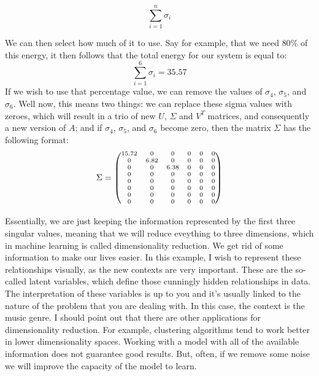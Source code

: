 \documentclass[600paper, 11pt,twoside,openany]{kdp}
\begin{document}
\[\sum_{i=1}^n \sigma_i\]
\par 
\vspace{-3pt}
\indent We can then select how much of it to use. Say for example, that we need $80\%$ of this energy, it then follows that the total energy for our system is equal to:
\[\sum_{i=1}^6 \sigma_i = 35.57\]
\indent If we wish to use that percentage value, we can remove the values of  $\sigma_4$, $\sigma_5$, and  $\sigma_6$. Well now, this means two things: we can replace these sigma values with zeroes, which will result in a trio of new $U$, $\Sigma$ and $V^T$  matrices, and consequently a new version of $A$; and if  $\sigma_4$, $\sigma_5$, and $\sigma_6$ become zero, then the matrix $\Sigma$ has the following format:
\[
\scriptsize{
\Sigma = 
\begin{pmatrix}
15.72 & 0 & 0 & 0 & 0 & 0 \\
0 & 6.82 & 0 & 0 & 0 & 0 \\
0 & 0 & 6.38 & 0 & 0 & 0 \\
0 & 0 & 0 & 0 & 0 & 0 \\
0 & 0 & 0 & 0 & 0 & 0 \\
0 & 0 & 0 & 0 & 0 & 0 \\
0 & 0 & 0 & 0 & 0 & 0 \\
0 & 0 & 0 & 0 & 0 & 0 \\
\end{pmatrix}
}
\]
\par 
\vspace{-3pt}
\indent Essentially, we are just keeping the information represented by the first three singular values, meaning that we will reduce eveything to three dimensions, which in machine learning is called dimensionality reduction. We get rid of some information to make our lives easier. In this example, I wish to represent these relationships visually, as the new contexts are very important. These are the so-called latent variables, which define those cunningly hidden relationships in data. The interpretation of these variables is up to you and it’s usually linked to the nature of the problem that you are dealing with. In this case, the context is the music genre. I should point out that there are other applications for dimensionality reduction. For example, clustering algorithms tend to work better in lower dimensionality spaces. Working with a model with all of the available information does not guarantee good results. But, often, if we remove some noise we will improve the capacity of the model to learn.
\par 
\vspace{-3pt}
\end{document}
